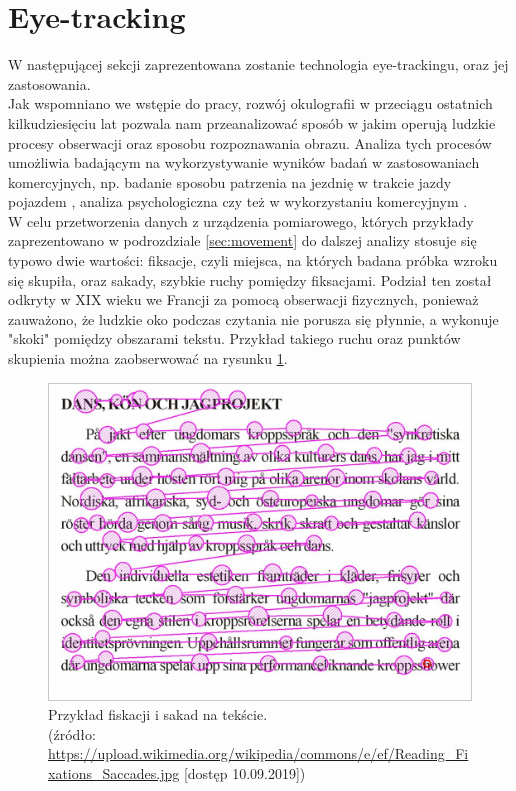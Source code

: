 \section{Eye-tracking}
\label{sec:eyetracking}
W następującej sekcji zaprezentowana zostanie technologia eye-trackingu, oraz jej zastosowania.\\[\baselineskip]
Jak wspomniano we wstępie do pracy, rozwój okulografii w przeciągu ostatnich kilkudziesięciu lat pozwala nam przeanalizować sposób w jakim operują ludzkie procesy obserwacji oraz sposobu rozpoznawania obrazu. Analiza tych procesów umożliwia badającym na wykorzystywanie wyników badań w zastosowaniach komercyjnych, np. badanie sposobu patrzenia na jezdnię w trakcie jazdy pojazdem \cite{CarSteering}, analiza psychologiczna \cite{GazeEyeTrackingSolutions} czy też w wykorzystaniu komercyjnym \cite{Advertising}.\\[\baselineskip]
W celu przetworzenia danych z urządzenia pomiarowego, których przykłady zaprezentowano w podrozdziale \ref{sec:movement} do dalszej analizy stosuje się typowo dwie wartości: fiksacje, czyli miejsca, na których badana próbka wzroku się skupiła, oraz sakady, szybkie ruchy pomiędzy fiksacjami. Podział ten został odkryty w XIX wieku we Francji za pomocą obserwacji fizycznych, ponieważ zauważono, że ludzkie oko podczas czytania nie porusza się płynnie, a wykonuje "skoki" pomiędzy obszarami tekstu. Przykład takiego ruchu oraz punktów skupienia można zaobserwować na rysunku \ref{fig:fiksacje}.
\begin{figure}[H]
    \centering
    \captionsetup{justification=centering,margin=2cm}
    \includegraphics[width=0.8\linewidth]{resources/fixation_example.jpg}
    \caption[Przykład fiskacji i sakad na tekście.]{Przykład fiskacji i sakad na tekście.\\\hspace{\textwidth}
    \small(źródło: \url{https://upload.wikimedia.org/wikipedia/commons/e/ef/Reading_Fixations_Saccades.jpg} [dostęp 10.09.2019])}
    \label{fig:fiksacje}
\end{figure}
